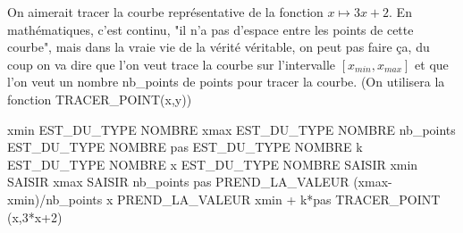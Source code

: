 \begin{exemple}
On aimerait tracer la courbe représentative de la fonction $x\mapsto 3x+2$. En mathématiques, c'est continu, "il n'a pas d'espace entre les points de cette courbe", mais dans la vraie vie de la vérité véritable, on peut pas faire ça, du coup on va dire que l'on veut trace la courbe sur l'intervalle $[x_{min},x_{max}]$ et que l'on veut un nombre nb\_points de points pour tracer la courbe. (On utilisera la fonction TRACER\_POINT(x,y))
\begin{algobox}
\Variables
\Ligne xmin EST\_DU\_TYPE NOMBRE
\Ligne xmax EST\_DU\_TYPE NOMBRE
\Ligne nb\_points EST\_DU\_TYPE NOMBRE
\Ligne pas EST\_DU\_TYPE NOMBRE
\Ligne k EST\_DU\_TYPE NOMBRE
\Ligne x EST\_DU\_TYPE NOMBRE
\DebutAlgo
\Ligne SAISIR xmin
\Ligne SAISIR xmax
\Ligne SAISIR nb\_points
\Ligne pas PREND\_LA\_VALEUR (xmax-xmin)/nb\_points
\DebutPour
\Ligne x PREND\_LA\_VALEUR xmin + k*pas
\Ligne TRACER\_POINT (x,3*x+2)
\FinPour
\FinAlgo


\end{algobox}
\end{exemple}

